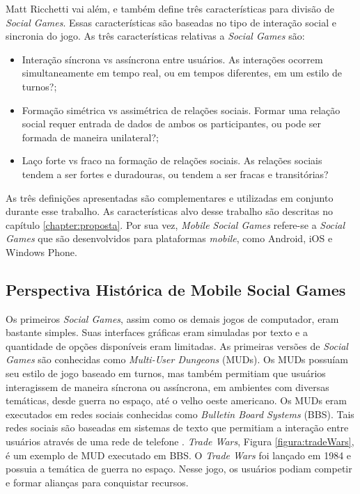 Matt Ricchetti \cite{ricchetti2015} vai além, e também define três características para divisão de \textit{Social Games}. Essas características são baseadas no tipo de interação social e sincronia do jogo. As três características relativas a \textit{Social Games} são:

\begin{itemize}
  \item Interação síncrona vs assíncrona entre usuários. As interações ocorrem simultaneamente em tempo real, ou em tempos diferentes, em um estilo de turnos?;
  \item Formação simétrica vs assimétrica de relações sociais. Formar uma relação social requer entrada de dados de ambos os participantes, ou pode ser formada de maneira unilateral?;
  \item Laço forte vs fraco na formação de relações sociais. As relações sociais tendem a ser fortes e duradouras, ou tendem a ser fracas e transitórias?
\end{itemize}

As três definições apresentadas são complementares e utilizadas em conjunto
durante esse trabalho. As características alvo desse trabalho são descritas no
capítulo \ref{chapter:proposta}.
Por sua vez, \textit{Mobile Social Games} refere-se a \textit{Social Games} que são desenvolvidos para plataformas \textit{mobile}, como Android, iOS e Windows Phone.

  \subsection{Perspectiva Histórica de Mobile Social Games}

Os primeiros \textit{Social Games}, assim como os demais jogos de computador,
eram bastante simples. Suas interfaces gráficas eram simuladas por texto e a
quantidade de opções disponíveis eram limitadas. As primeiras versões de
\textit{Social Games} são conhecidas como \textit{Multi-User Dungeons}
(MUDs)\cite{edward1997}. Os MUDs possuíam seu estilo de jogo baseado em turnos,
mas também permitiam que usuários interagissem de maneira síncrona ou
assíncrona, em ambientes com diversas temáticas, desde guerra no espaço, até o
velho oeste americano. Os MUDs eram executados em redes sociais conhecidas como
\textit{Bulletin Board Systems} (BBS). Tais redes sociais são baseadas em
sistemas de texto que permitiam a interação entre usuários através de uma rede
de telefone \cite{fields2014}. \textit{Trade Wars}, Figura
\ref{figura:tradeWars}, é um exemplo de MUD executado em BBS. O \textit{Trade
Wars} foi lançado em 1984 e possuia a temática de guerra no espaço. Nesse jogo,
os usuários podiam competir e formar alianças para conquistar recursos.


